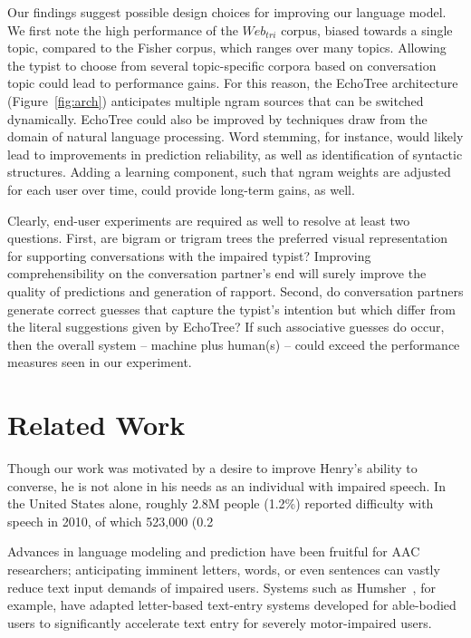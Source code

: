\documentclass{sigchi}
\begin{document}
Our findings suggest possible design choices for improving our language model. We first note the high performance of the $Web_{tri}$ corpus, biased towards a single topic, compared to the Fisher corpus, which ranges over many topics. Allowing the typist to choose from several topic-specific corpora based on conversation topic could lead to performance gains. For this reason, the EchoTree architecture (Figure~\ref{fig:arch}) anticipates multiple ngram sources that can be switched dynamically. EchoTree could also be improved by techniques draw from the domain of natural language processing. Word stemming, for instance, would likely lead to improvements in prediction reliability, as well as identification of syntactic structures. Adding a learning component, such that ngram weights are adjusted for each user over time, could provide long-term gains, as well.

Clearly, end-user experiments are required as well to resolve at least two questions. First, are bigram or trigram trees the preferred visual representation for supporting conversations with the impaired typist? Improving comprehensibility on the conversation partner’s end will surely improve the quality of predictions and generation of rapport. Second, do conversation partners generate correct guesses that capture the typist’s intention but which differ from the literal suggestions given by EchoTree? If such associative guesses do occur, then the overall system -- machine plus human(s) -- could exceed the performance measures seen in our experiment.

\section{Related Work}

Though our work was motivated by a desire to improve Henry's ability to converse, he is not alone in his needs as an individual with impaired speech. In the United States alone, roughly 2.8M people (1.2\%) reported difficulty with speech in 2010, of which 523,000 (0.2%

Advances in language modeling and prediction have been fruitful for
AAC researchers; anticipating imminent letters, words, or even
sentences can vastly reduce text input demands of impaired
users. Systems such as Humsher~\cite{Polacek2011}, for example, have
adapted letter-based text-entry systems developed for able-bodied
users to significantly accelerate text entry for severely
motor-impaired users. 
\end{document}
